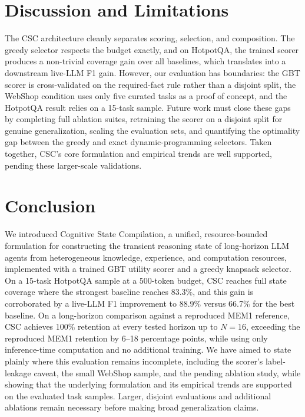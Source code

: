 \documentclass{article}
\begin{document}
\section{Discussion and Limitations}

The CSC architecture cleanly separates scoring, selection, and composition. The greedy selector respects the budget exactly, and on HotpotQA, the trained scorer produces a non-trivial coverage gain over all baselines, which translates into a downstream live-LLM F1 gain. However, our evaluation has boundaries: the GBT scorer is cross-validated on the required-fact rule rather than a disjoint split, the WebShop condition uses only five curated tasks as a proof of concept, and the HotpotQA result relies on a 15-task sample. Future work must close these gaps by completing full ablation suites, retraining the scorer on a disjoint split for genuine generalization, scaling the evaluation sets, and quantifying the optimality gap between the greedy and exact dynamic-programming selectors. Taken together, CSC's core formulation and empirical trends are well supported, pending these larger-scale validations.

\section{Conclusion}

We introduced Cognitive State Compilation, a unified, resource-bounded formulation for constructing the transient reasoning state of long-horizon LLM agents from heterogeneous knowledge, experience, and computation resources, implemented with a trained GBT utility scorer and a greedy knapsack selector. On a 15-task HotpotQA sample at a 500-token budget, CSC reaches full state coverage where the strongest baseline reaches 83.3\%, and this gain is corroborated by a live-LLM F1 improvement to 88.9\% versus 66.7\% for the best baseline. On a long-horizon comparison against a reproduced MEM1 reference, CSC achieves 100\% retention at every tested horizon up to $N=16$, exceeding the reproduced MEM1 retention by 6--18 percentage points, while using only inference-time computation and no additional training. We have aimed to state plainly where this evaluation remains incomplete, including the scorer's label-leakage caveat, the small WebShop sample, and the pending ablation study, while showing that the underlying formulation and its empirical trends are supported on the evaluated task samples. Larger, disjoint evaluations and additional ablations remain necessary before making broad generalization claims.
\end{document}

